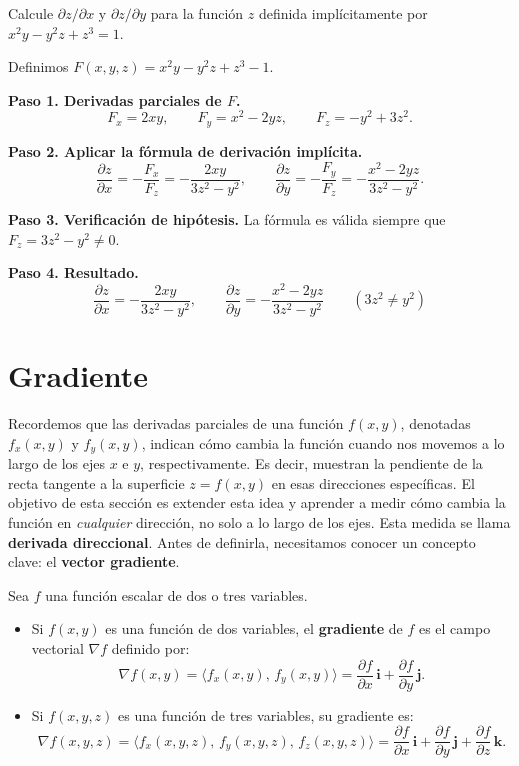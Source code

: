 \begin{prob}
Calcule $\partial z/\partial x$ y $\partial z/\partial y$ para la función $z$ definida implícitamente por $x^2 y - y^2 z + z^3 = 1$.
\begin{myproof}
Definimos $F(x,y,z)=x^2y-y^2z+z^3-1$.

\textbf{Paso 1. Derivadas parciales de $F$.}
\[
F_x = 2xy,\qquad F_y = x^2-2yz,\qquad F_z = -y^2+3z^2.
\]

\textbf{Paso 2. Aplicar la fórmula de derivación implícita.}
\[
\frac{\partial z}{\partial x} = -\frac{F_x}{F_z}
= -\frac{2xy}{3z^2-y^2},\qquad
\frac{\partial z}{\partial y} = -\frac{F_y}{F_z}
= -\frac{x^2-2yz}{3z^2-y^2}.
\]

\textbf{Paso 3. Verificación de hipótesis.}
La fórmula es válida siempre que $F_z=3z^2-y^2\neq 0$.

\textbf{Paso 4. Resultado.}
\[
\boxed{\frac{\partial z}{\partial x}=-\frac{2xy}{3z^2-y^2},\qquad
\frac{\partial z}{\partial y}=-\frac{x^2-2yz}{3z^2-y^2}}
\qquad(3z^2\neq y^2)
\]
\end{myproof}
\end{prob}

\section{Gradiente}

Recordemos que las derivadas parciales de una función $f(x,y)$,
denotadas $f_x(x,y)$ y $f_y(x,y)$, indican cómo cambia la función
cuando nos movemos a lo largo de los ejes $x$ e $y$, respectivamente.
Es decir, muestran la pendiente de la recta tangente a la superficie
$z=f(x,y)$ en esas direcciones específicas. El objetivo de esta sección
es extender esta idea y aprender a medir cómo cambia la función en
\emph{cualquier} dirección, no solo a lo largo de los ejes. Esta medida
se llama \textbf{derivada direccional}. Antes de definirla,
necesitamos conocer un concepto clave: el \textbf{vector gradiente}.

\begin{definition}
Sea $f$ una función escalar de dos o tres variables.
\begin{itemize}
    \item Si $f(x,y)$ es una función de dos variables, el \textbf{gradiente}
    de $f$ es el campo vectorial $\nabla f$ definido por:
    \[
    \nabla f(x,y) = \langle f_x(x,y),\, f_y(x,y) \rangle
                  = \frac{\partial f}{\partial x}\,\mathbf{i}
                    + \frac{\partial f}{\partial y}\,\mathbf{j}.
    \]
    \item Si $f(x,y,z)$ es una función de tres variables, su gradiente es:
    \[
    \nabla f(x,y,z) = \langle f_x(x,y,z),\, f_y(x,y,z),\,
    f_z(x,y,z) \rangle
    = \frac{\partial f}{\partial x}\,\mathbf{i}
      + \frac{\partial f}{\partial y}\,\mathbf{j}
      + \frac{\partial f}{\partial z}\,\mathbf{k}.
    \]
\end{itemize}
\end{definition}

